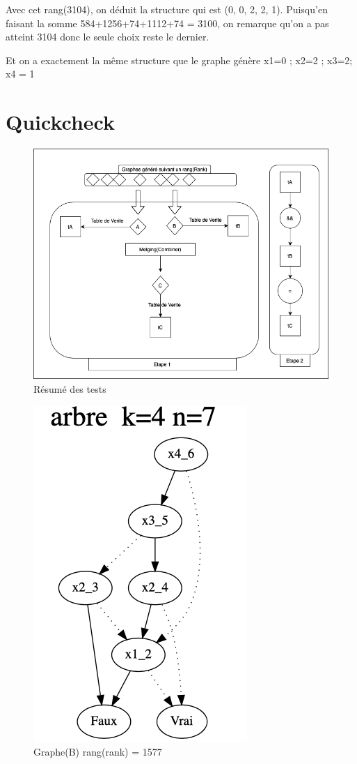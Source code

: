 \documentclass[french]{article}
\begin{document}
Avec cet rang(3104), on déduit la structure qui est (0, 0, 2, 2, 1). Puisqu'en faisant la somme 584+1256+74+1112+74 = 3100, on remarque qu'on a pas atteint 3104 donc le seule choix reste le dernier.

Et on a exactement la même structure que le graphe génère {x1=0 ; x2=2  ; x3=2; x4 = 1}

\section{Quickcheck}

\begin{figure}[h!]
    \centering
    \includegraphics[scale=0.3]{generator.png}
    \caption{Résumé des tests}
    \label{fig:Concept}
\end{figure}

\begin{figure}[h!]
    \centering
    \includegraphics[scale=0.4]{arb_1577.png}
    \caption{Graphe(B) rang(rank) = 1577}
    \label{fig:graphe_B}
\end{figure}
\end{document}
